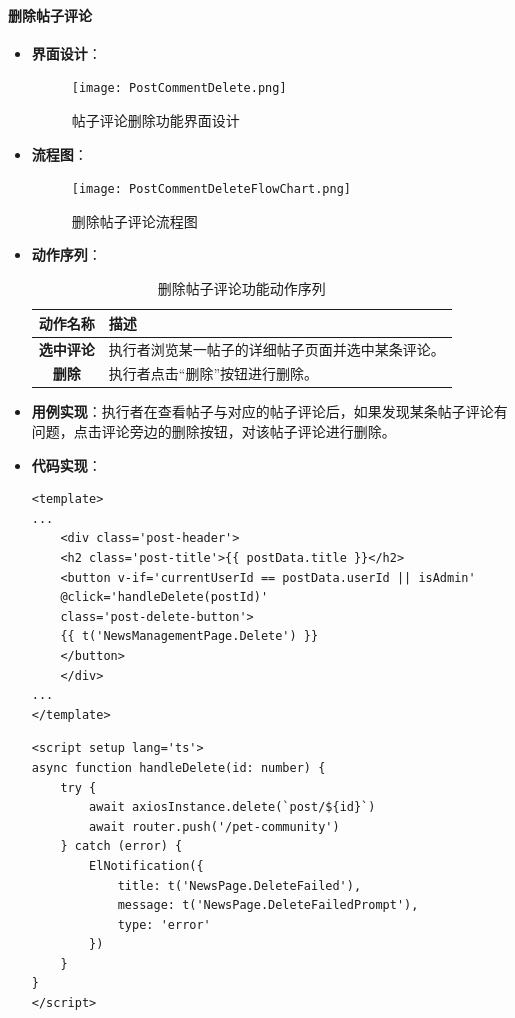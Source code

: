 \paragraph{删除帖子评论}
\begin{itemize}
	\item \textbf{界面设计}：
	
	\begin{figure}[H]
		\centering
		\texttt{[image: PostCommentDelete.png]}
		\caption{帖子评论删除功能界面设计}
		\label{fig:post-comment-report.png}
	\end{figure}
	
	\item \textbf{流程图}：
	\begin{figure}[H]
		\centering
		\texttt{[image: PostCommentDeleteFlowChart.png]}
		\caption{删除帖子评论流程图}
		\label{PostCommentDeleteFlowChart}
	\end{figure}
	\item \textbf{动作序列}：
	\begin{table}[H]
		\centering
		\caption{删除帖子评论功能动作序列}
		\renewcommand\arraystretch{1.5}
		\begin{tabular}{|c|>{\raggedright\arraybackslash}p{10cm}|}
			\hline
			\textbf{动作名称} & \textbf{描述} \\ \hline
			\textbf{选中评论} & 执行者浏览某一帖子的详细帖子页面并选中某条评论。 \\ \hline
			\textbf{删除} & 执行者点击“删除”按钮进行删除。 \\ \hline
		\end{tabular}
	\end{table}
	\item \textbf{用例实现}：执行者在查看帖子与对应的帖子评论后，如果发现某条帖子评论有问题，点击评论旁边的删除按钮，对该帖子评论进行删除。
	
	\item \textbf{代码实现}：
		\begin{verbatim}
<template>
...
	<div class='post-header'>
	<h2 class='post-title'>{{ postData.title }}</h2>
	<button v-if='currentUserId == postData.userId || isAdmin'
	@click='handleDelete(postId)'
	class='post-delete-button'>
	{{ t('NewsManagementPage.Delete') }}
	</button>
	</div>
...
</template>
	\end{verbatim}
	
	\begin{verbatim}
<script setup lang='ts'>
async function handleDelete(id: number) {
	try {
		await axiosInstance.delete(`post/${id}`)
		await router.push('/pet-community')
	} catch (error) {
		ElNotification({
			title: t('NewsPage.DeleteFailed'),
			message: t('NewsPage.DeleteFailedPrompt'),
			type: 'error'
		})
	}
}
</script>
	\end{verbatim}
	
\end{itemize}

